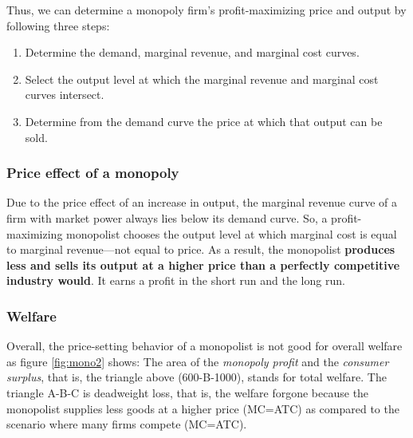 \documentclass[
  12pt,
  oneside]{book}
\providecommand{\tightlist}{%
  \setlength{\itemsep}{0pt}\setlength{\parskip}{0pt}}
\theoremstyle{definition}
\theoremstyle{definition}
\theoremstyle{definition}
\theoremstyle{definition}
\theoremstyle{remark}
\begin{document}
Thus, we can determine a monopoly firm's profit-maximizing price and output by following three steps:

\begin{enumerate}
\def\labelenumi{\arabic{enumi}.}
\tightlist
\item
  Determine the demand, marginal revenue, and marginal cost curves.
\item
  Select the output level at which the marginal revenue and marginal cost curves intersect.
\item
  Determine from the demand curve the price at which that output can be sold.
\end{enumerate}

\hypertarget{price-effect-of-a-monopoly}{%
\subsubsection*{Price effect of a monopoly}\label{price-effect-of-a-monopoly}}

Due to the price effect of an increase in output, the marginal revenue curve of a firm with market power always lies below its demand curve. So, a profit-maximizing monopolist chooses the output level at which marginal cost is equal to marginal revenue---not equal to price. As a result, the monopolist \textbf{produces less and sells its output at a higher price than a perfectly competitive industry would}. It earns a profit in the short run and the long run.

\hypertarget{welfare}{%
\subsubsection*{Welfare}\label{welfare}}

Overall, the price-setting behavior of a monopolist is not good for overall welfare as figure \ref{fig:mono2} shows: The area of the \emph{monopoly profit} and the \emph{consumer surplus}, that is, the triangle above (600-B-1000), stands for total welfare. The triangle A-B-C is deadweight loss, that is, the welfare forgone because the monopolist supplies less goods at a higher price (MC=ATC) as compared to the scenario where many firms compete (MC=ATC).
\end{document}

